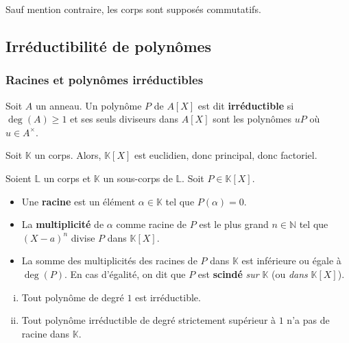 



	
	Sauf mention contraire, les corps sont supposés commutatifs.
	
	\subsection{Irréductibilité de polynômes}
	
	\subsubsection{Racines et polynômes irréductibles}
	
	
	\begin{definition}
		Soit $A$ un anneau. Un polynôme $P$ de $A[X]$ est dit \textbf{irréductible} si $\deg(A) \geq 1$ et ses seuls diviseurs dans $A[X]$ sont les polynômes $uP$ où $u \in A^{\times}$.
	\end{definition}
	
	\begin{remark}
		Soit $\mathbb{K}$ un corps. Alors, $\mathbb{K}[X]$ est euclidien, donc principal, donc factoriel.
	\end{remark}
	
	\begin{definition}
		Soient $\mathbb{L}$ un corps et $\mathbb{K}$ un sous-corps de $\mathbb{L}$. Soit $P \in \mathbb{K}[X]$.
		\begin{itemize}
			\item Une \textbf{racine} est un élément $\alpha \in \mathbb{K}$ tel que $P(\alpha) = 0$.
			\item La \textbf{multiplicité} de $\alpha$ comme racine de $P$ est le plus grand $n \in \mathbb{N}$ tel que $(X-a)^n$ divise $P$ dans $\mathbb{K}[X]$.
			\item La somme des multiplicités des racines de $P$ dans $\mathbb{K}$ est inférieure ou égale à $\deg(P)$. En cas d'égalité, on dit que $P$ est \textbf{scindé} \textit{sur} $\mathbb{K}$ (ou \textit{dans} $\mathbb{K}[X]$).
		\end{itemize}
	\end{definition}
	
	\begin{proposition}
		\label{141-1}
		\begin{enumerate}[(i)]
			\item Tout polynôme de degré $1$ est irréductible.
			\item \label{141-2} Tout polynôme irréductible de degré strictement supérieur à $1$ n'a pas de racine dans $\mathbb{K}$.
		\end{enumerate}
	\end{proposition}
	
